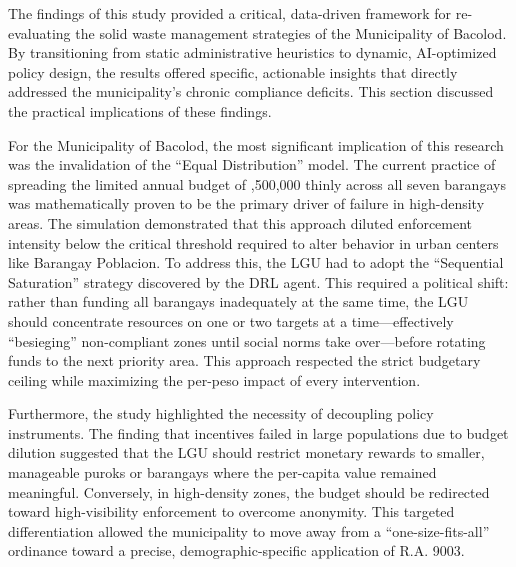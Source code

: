 
The findings of this study provided a critical, data-driven framework for re-evaluating the solid waste management strategies of the Municipality of Bacolod. By transitioning from static administrative heuristics to dynamic, AI-optimized policy design, the results offered specific, actionable insights that directly addressed the municipality's chronic compliance deficits. This section discussed the practical implications of these findings.

For the Municipality of Bacolod, the most significant implication of this research was the invalidation of the ``Equal Distribution'' model. The current practice of spreading the limited annual budget of ,500,000 thinly across all seven barangays was mathematically proven to be the primary driver of failure in high-density areas. The simulation demonstrated that this approach diluted enforcement intensity below the critical threshold required to alter behavior in urban centers like Barangay Poblacion. To address this, the LGU had to adopt the ``Sequential Saturation'' strategy discovered by the DRL agent. This required a political shift: rather than funding all barangays inadequately at the same time, the LGU should concentrate resources on one or two targets at a time—effectively ``besieging'' non-compliant zones until social norms take over—before rotating funds to the next priority area. This approach respected the strict budgetary ceiling while maximizing the per-peso impact of every intervention.

Furthermore, the study highlighted the necessity of decoupling policy instruments. The finding that incentives failed in large populations due to budget dilution suggested that the LGU should restrict monetary rewards to smaller, manageable puroks or barangays where the per-capita value remained meaningful. Conversely, in high-density zones, the budget should be redirected toward high-visibility enforcement to overcome anonymity. This targeted differentiation allowed the municipality to move away from a ``one-size-fits-all'' ordinance toward a precise, demographic-specific application of R.A. 9003.
